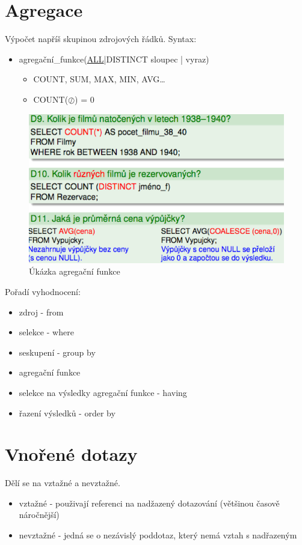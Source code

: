\documentclass{szzclass}
\begin{document}
\tableofcontents
\newpage

\section{Agregace}
Výpočet napříš skupinou zdrojových řádků. Syntax:
\begin{itemize}
    \item agregační\_funkce({\underline{ALL}|DISTINCT} sloupec | vyraz)
    \begin{itemize}
        \item COUNT, SUM, MAX, MIN, AVG\dots
        \item COUNT($\oslash$) = 0
    \end{itemize}
\end{itemize}
\begin{figure}[h!]
    \centering
    \includegraphics[width = 0.8 \textwidth]{topics/bi-wsi-si-04/images/agregation.png}
    \caption{Úkázka agregační funkce}
\end{figure}
Pořadí vyhodnocení:
\begin{itemize}
    \item zdroj - from
    \item selekce - where
    \item seskupení - group by
    \item agregační funkce
    \item selekce na výsledky agregační funkce - having
    \item řazení výsledků - order by
\end{itemize}
\section{Vnořené dotazy}
Dělí se na vztažné a nevztažné.
\begin{itemize}
    \item vztažné - použivají referenci na nadžazený dotazování (většinou časově náročnější)
    \item nevztažné - jedná se o nezávislý poddotaz, který nemá vztah s nadřazeným
\end{itemize}
\end{document}
